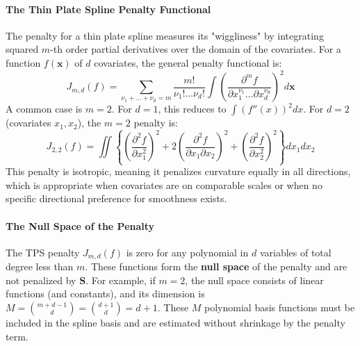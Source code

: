 \documentclass[11pt, a4paper]{article}
\begin{document}
\begin{itemize}
\paragraph{The Thin Plate Spline Penalty Functional}
The penalty for a thin plate spline measures its "wiggliness" by integrating squared $m$-th order partial derivatives over the domain of the covariates. For a function $f(\mathbf{x})$ of $d$ covariates, the general penalty functional is:
\[ J_{m,d}(f) = \sum_{\nu_1+\dots+\nu_d = m} \frac{m!}{\nu_1! \dots \nu_d!} \int \left( \frac{\partial^m f}{\partial x_1^{\nu_1} \dots \partial x_d^{\nu_d}} \right)^2 d\mathbf{x} \]
A common case is $m=2$. For $d=1$, this reduces to $\int (f''(x))^2 dx$. For $d=2$ (covariates $x_1, x_2$), the $m=2$ penalty is:
\[ J_{2,2}(f) = \iint \left\{ \left(\frac{\partial^2 f}{\partial x_1^2}\right)^2 + 2\left(\frac{\partial^2 f}{\partial x_1 \partial x_2}\right)^2 + \left(\frac{\partial^2 f}{\partial x_2^2}\right)^2 \right\} dx_1 dx_2 \]
This penalty is isotropic, meaning it penalizes curvature equally in all directions, which is appropriate when covariates are on comparable scales or when no specific directional preference for smoothness exists.

\paragraph{The Null Space of the Penalty}
The TPS penalty $J_{m,d}(f)$ is zero for any polynomial in $d$ variables of total degree less than $m$. These functions form the \textbf{null space} of the penalty and are not penalized by $\mathbf{S}$. For example, if $m=2$, the null space consists of linear functions (and constants), and its dimension is $M = \binom{m+d-1}{d} = \binom{d+1}{d} = d+1$. These $M$ polynomial basis functions must be included in the spline basis and are estimated without shrinkage by the penalty term.


\end{itemize}
\end{document}
